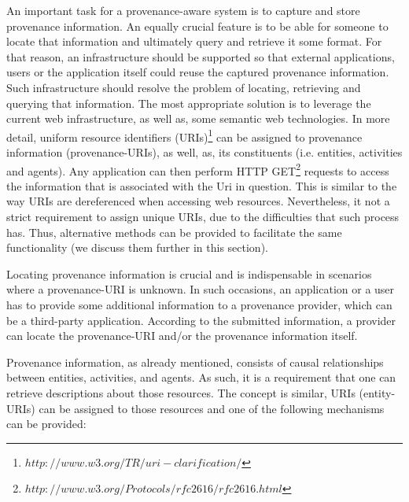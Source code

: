 An important task for a provenance-aware system is to capture and store provenance information. An equally crucial feature is to be able for someone to locate that information and ultimately query and retrieve it some format\cite{reference35}.  For that reason, an infrastructure should be supported so that external applications, users or the application itself could reuse the captured provenance information. Such infrastructure should resolve the problem of locating, retrieving and querying that information. The most appropriate solution is to leverage the current web infrastructure, as well as, some semantic web technologies. In more detail, uniform resource identifiers (URIs)\footnote{$http://www.w3.org/TR/uri-clarification/$} can be assigned to provenance information (provenance-URIs), as well, as, its constituents (i.e. entities, activities and agents). Any application can then perform HTTP GET\footnote{$http://www.w3.org/Protocols/rfc2616/rfc2616.html$} requests to access the information that is associated with the Uri in question\cite{prov-AQ}. This is similar to the way URIs are dereferenced when accessing web resources. Nevertheless, it not a strict requirement to assign unique URIs, due to the difficulties that such process has. Thus, alternative methods can be provided to facilitate the same functionality (we discuss them further in this section).

Locating provenance information is crucial and is indispensable in scenarios where a provenance-URI is unknown. In such occasions, an application or a user has to provide some additional information to a provenance provider, which can be a third-party application. According to the submitted information, a provider can locate the provenance-URI and/or the provenance information itself.

Provenance information, as already mentioned, consists of causal relationships between entities, activities, and agents. As such, it is a requirement that one can retrieve descriptions about those resources. The concept is similar, URIs (entity-URIs) can be assigned to those resources and one of the following mechanisms can be provided:

